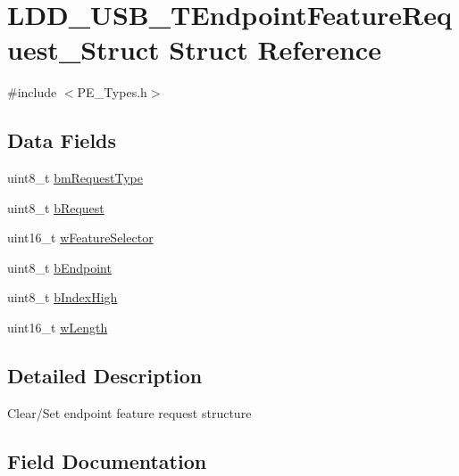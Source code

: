 \hypertarget{struct_l_d_d___u_s_b___t_endpoint_feature_request___struct}{}\section{L\+D\+D\+\_\+\+U\+S\+B\+\_\+\+T\+Endpoint\+Feature\+Request\+\_\+\+Struct Struct Reference}
\label{struct_l_d_d___u_s_b___t_endpoint_feature_request___struct}


{\ttfamily \#include $<$P\+E\+\_\+\+Types.\+h$>$}

\subsection*{Data Fields}
\begin{DoxyCompactItemize}
\item 
uint8\+\_\+t \hyperlink{struct_l_d_d___u_s_b___t_endpoint_feature_request___struct_adc137c604066ff6d3c614dbaa2cb225f}{bm\+Request\+Type}
\item 
uint8\+\_\+t \hyperlink{struct_l_d_d___u_s_b___t_endpoint_feature_request___struct_acd2dcd4a8762d22f84cfe3b9d9607a25}{b\+Request}
\item 
uint16\+\_\+t \hyperlink{struct_l_d_d___u_s_b___t_endpoint_feature_request___struct_aa026e7ce420430dc65a72dcc10337553}{w\+Feature\+Selector}
\item 
uint8\+\_\+t \hyperlink{struct_l_d_d___u_s_b___t_endpoint_feature_request___struct_a411af4337f39b9553d65d73bee6af5ec}{b\+Endpoint}
\item 
uint8\+\_\+t \hyperlink{struct_l_d_d___u_s_b___t_endpoint_feature_request___struct_aeec172fdf61100889cd7f70958283f48}{b\+Index\+High}
\item 
uint16\+\_\+t \hyperlink{struct_l_d_d___u_s_b___t_endpoint_feature_request___struct_aec7dc034039bc4deb5c811afac0686a5}{w\+Length}
\end{DoxyCompactItemize}


\subsection{Detailed Description}
Clear/\+Set endpoint feature request structure 

\subsection{Field Documentation}
